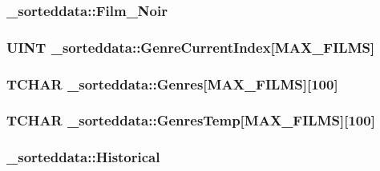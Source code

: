 \subsubsection[{Film\+\_\+\+Noir}]{ \+\_\+sorteddata\+::\+Film\+\_\+\+Noir}\label{struct__sorteddata_abdce39e21b4d3f5abd59b3f627055d78}
\hypertarget{struct__sorteddata_ae1caef01262daf05883c3dc41e4bac7c}{}
\subsubsection[{Genre\+Current\+Index}]{\setlength{\rightskip}{0pt plus 5cm}U\+I\+N\+T \+\_\+sorteddata\+::\+Genre\+Current\+Index\mbox{[}{\bf M\+A\+X\+\_\+\+F\+I\+L\+M\+S}\mbox{]}}\label{struct__sorteddata_ae1caef01262daf05883c3dc41e4bac7c}
\hypertarget{struct__sorteddata_abc4b7fe250ca171576e556746b6746f1}{}
\subsubsection[{Genres}]{\setlength{\rightskip}{0pt plus 5cm}T\+C\+H\+A\+R \+\_\+sorteddata\+::\+Genres\mbox{[}{\bf M\+A\+X\+\_\+\+F\+I\+L\+M\+S}\mbox{]}\mbox{[}100\mbox{]}}\label{struct__sorteddata_abc4b7fe250ca171576e556746b6746f1}
\hypertarget{struct__sorteddata_a7d7b308abf87e4def51864eafeb8187d}{}
\subsubsection[{Genres\+Temp}]{\setlength{\rightskip}{0pt plus 5cm}T\+C\+H\+A\+R \+\_\+sorteddata\+::\+Genres\+Temp\mbox{[}{\bf M\+A\+X\+\_\+\+F\+I\+L\+M\+S}\mbox{]}\mbox{[}100\mbox{]}}\label{struct__sorteddata_a7d7b308abf87e4def51864eafeb8187d}
\hypertarget{struct__sorteddata_a40c33b3577f4eeb4d78fc230a310e688}{}
\subsubsection[{Historical}]{ \+\_\+sorteddata\+::\+Historical}\label{struct__sorteddata_a40c33b3577f4eeb4d78fc230a310e688}
\hypertarget{struct__sorteddata_ad32928b55309a9ab9417894f7deee67b}{}
